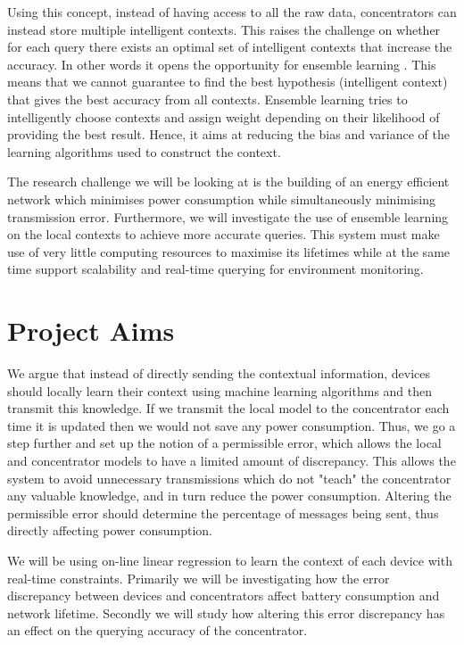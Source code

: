 \documentclass{mproj}
\begin{document}
Using this concept, instead of having access to all the raw data, concentrators can instead store multiple intelligent contexts. This raises the challenge on whether for each query there exists an optimal set of intelligent contexts that increase the accuracy. In other words it opens the opportunity for ensemble learning \cite{dietterich2002ensemble}. This means that we cannot guarantee to find the best hypothesis (intelligent context) that gives the best accuracy from all contexts. Ensemble learning tries to intelligently choose contexts and assign weight depending on their likelihood of providing the best result. Hence, it aims at reducing the bias and variance of the learning algorithms used to construct the context. \cite{dietterich2002ensemble}

The research challenge we will be looking at is the building of an energy efficient network which minimises power consumption while simultaneously minimising transmission error. Furthermore, we will investigate the use of ensemble learning on the local contexts to achieve more accurate queries. This system must make use of very little computing resources to maximise its lifetimes while at the same time support scalability and real-time querying for environment monitoring.

\section{Project Aims}
We argue that instead of directly sending the contextual information, devices should locally learn their context using machine learning algorithms and then transmit this knowledge. If we transmit the local model to the concentrator each time it is updated then we would not save any power consumption. Thus, we go a step further and set up the notion of a  permissible error, which allows the local and concentrator models to have a limited amount of discrepancy. This allows the system to avoid unnecessary transmissions which do not "teach" the concentrator any valuable knowledge, and in turn reduce the power consumption. Altering the permissible error should determine the percentage of messages being sent, thus directly affecting power consumption.

We will be using on-line linear regression to learn the context of each device with real-time constraints. Primarily we will be investigating how the error discrepancy between devices and concentrators affect battery consumption and network lifetime. Secondly we will study how altering this error discrepancy has an effect on the querying accuracy of the concentrator.
\end{document}
